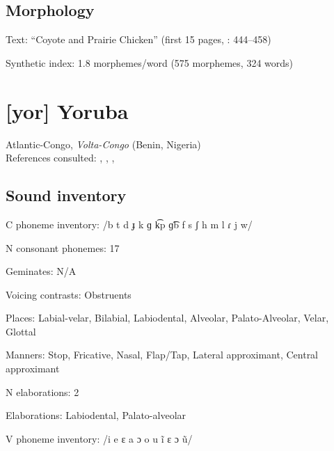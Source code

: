 {\subsection*{Morphology}

\begin{appendixdesc}

\item[Text:] “Coyote and Prairie Chicken” (first 15 pages, \citealt{Jansen2010}: 444--458)

\item[Synthetic index:] 1.8 morphemes/word (575 morphemes, 324 words)
\end{appendixdesc}

\section*{[yor] Yoruba}  %
Atlantic-Congo, \textit{Volta-Congo} (Benin, Nigeria)\medskip\\
References consulted: \citet{Bamgbose1966}, \citet{Rowlands1969}, \citet{Seidl2000}, \citet{Siertsema1959}

\subsection*{Sound inventory}
\begin{appendixdesc}

\item[C phoneme inventory:] /b t d ɟ k ɡ k͡p ɡ͡b f s ʃ h m l ɾ j w/

\item[N consonant phonemes:] 17

\item[Geminates:] N/A

\item[Voicing contrasts:] Obstruents

\item[Places:] Labial-velar, Bilabial, Labiodental, Alveolar, Palato-Alveolar, Velar, Glottal

\item[Manners:] Stop, Fricative, Nasal, Flap/Tap, Lateral approximant, Central approximant

\item[N elaborations:] 2

\item[Elaborations:] Labiodental, Palato-alveolar

\item[V phoneme inventory:] /i e ɛ a ɔ o u ĩ ɛ ɔ ũ/


\end{appendixdesc}}
